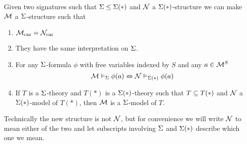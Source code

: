 \begin{prop}
    Given two signatures such that 
    $\Sigma \leq \Sigma(*)$ and
    $\mathcal{N}$ a $\Sigma(*)$-structure we can make 
    $\mathcal{M}$ a $\Sigma$-structure such that
    \begin{enumerate}
        \item ${\mathcal{M}}_\mathrm{car} = {\mathcal{N}}_\mathrm{car}$
        \item They have the same interpretation on $\Sigma$.
        \item For any $\Sigma$-formula $\phi$ with free variables indexed by $S$
            and any $a \in \mathcal{M}^S$
            \[\mathcal{M} \vDash_{\Sigma} \phi(a) \Leftrightarrow \mathcal{N} \vDash_{\Sigma(*)} \phi(a)\]
        \item If $T$ is a $\Sigma$-theory and $T(*)$ is a $\Sigma(*)$-theory 
            such that $T \subseteq T(*)$ and $\mathcal{N}$ a $\Sigma(*)$-model of $T(*)$,
            then $\mathcal{M}$ is a $\Sigma$-model of $T$.
    \end{enumerate}
    Technically the new structure is not $\mathcal{N}$,
    but for convenience we will write 
    $\mathcal{N}$ to mean either of the two and let subscripts involving 
    $\Sigma$ and $\Sigma(*)$ describe which one we mean.
\end{prop}
